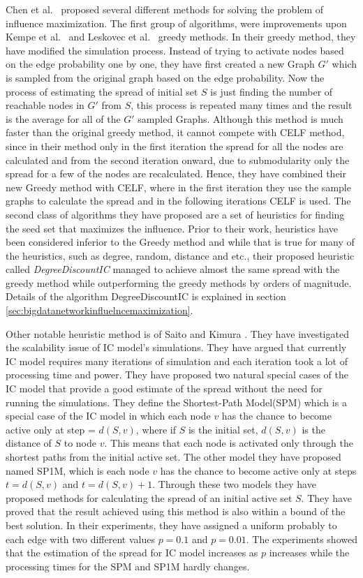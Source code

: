 \documentclass[english]{tktltiki}
\begin{document}
Chen et al.\ \cite{chen09} proposed several different methods for solving the problem of influence maximization. 
The first group of algorithms, were improvements upon Kempe et al.\ \cite{kempe03} and Leskovec et al.\ \cite{leskovec07} greedy methods. In their greedy method, they have modified the simulation process. 
Instead of trying to activate nodes based on the edge probability one by one, they have first created a new Graph $G'$ which is sampled from the original graph based on the edge probability. 
Now the process of estimating the spread of initial set $S$ is just finding the number of reachable nodes in $G'$ from $S$, this process is repeated many times and the result is the average for all of the $G'$ sampled Graphs. 
Although this method is much faster than the original greedy method, it cannot compete with CELF \cite{leskovec07} method, since in their method only in the first iteration the spread for all the nodes are calculated and from the second iteration onward, due to submodularity only the spread for a few of the nodes are recalculated. 
Hence, they have combined their new Greedy method with CELF, where in the first iteration they use the sample graphs to calculate the spread and in the following iterations CELF is used. 
The second class of algorithms they have proposed are a set of heuristics for finding the seed set that maximizes the influence. 
Prior to their work, heuristics have been considered inferior to the Greedy method and while that is true for many of the heuristics, such as degree, random, distance and etc., their proposed heuristic called \textit{DegreeDiscountIC} managed to achieve almost the same spread with the greedy method while outperforming the greedy methods by orders of magnitude. 
Details of the algorithm DegreeDiscountIC is explained in section \ref{sec:bigdatanetworkinfluelncemaximization}.

Other notable heuristic method is of Saito and Kimura \cite{kimura06}. 
They have investigated the scalability issue of IC model's simulations. 
They have argued that currently IC model requires many iterations of simulation and each iteration took a lot of processing time and power. They have proposed two natural special cases of the IC model that provide a good estimate of the spread without the need for running the simulations. 
They define the Shortest-Path Model(SPM) which is a special case of the IC model in which each node $v$ has the chance to become active only at step = $d(S,v)$, where if $S$ is the initial set, $d(S,v)$ is the distance of $S$ to node $v$. 
This means that each node is activated only through the shortest paths from the initial active set. 
The other model they have proposed named SP1M, which is each node $v$ has the chance to become active only at steps $t = d(S,v)$ and $t =d(S,v) + 1$. 
Through these two models they have proposed methods for calculating the spread of an initial active set $S$. 
They have proved that the result achieved using this method is also within a bound of the best solution. 
In their experiments, they have assigned a uniform probably to each edge with two different values $p = 0.1$ and $p =0.01$. 
The experiments showed that the estimation of the spread for IC model increases as $p$ increases while the processing times for the SPM and SP1M hardly changes. 
\end{document}

